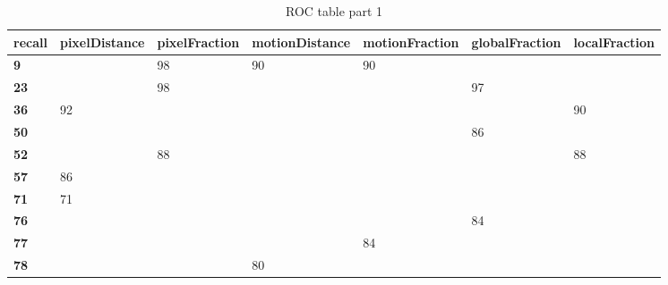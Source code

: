\begin{appendices}
\begin{landscape}
\begin{table}[!ht]
\centering
\caption{ROC table part 1}
\label{ROCTable1}
\begin{tabular}{|l|l|l|l|l|l|l|}
\hline
\textbf{recall} & \textbf{pixelDistance} & \textbf{pixelFraction} & \textbf{motionDistance} & \textbf{motionFraction} & \textbf{globalFraction} & \textbf{localFraction} \\ \hline
\textbf{9}      &                        & 98                     & 90                      & 90                      &                         &                        \\ \hline
\textbf{23}     &                        & 98                     &                         &                         & 97                      &                        \\ \hline
\textbf{36}     & 92                     &                        &                         &                         &                         & 90                     \\ \hline
\textbf{50}     &                        &                        &                         &                         & 86                      &                        \\ \hline
\textbf{52}     &                        & 88                     &                         &                         &                         & 88                     \\ \hline
\textbf{57}     & 86                     &                        &                         &                         &                         &                        \\ \hline
\textbf{71}     & 71                     &                        &                         &                         &                         &                        \\ \hline
\textbf{76}     &                        &                        &                         &                         & 84                      &                        \\ \hline
\textbf{77}     &                        &                        &                         & 84                      &                         &                        \\ \hline
\textbf{78}     &                        &                        & 80                      &                         &                         &                        \\ \hline

\end{tabular}
\end{table}
\end{landscape}
\end{appendices}
